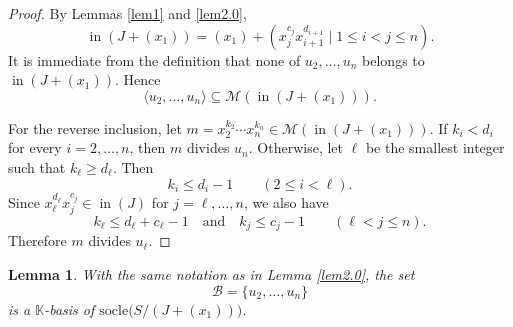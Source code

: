 \documentclass[12pt]{amsart}
\numberwithin{equation}{section}
\newtheorem{lemma}[theorem]{Lemma}
\theoremstyle{definition}
\newcommand{\init}{\ensuremath{\mathop{\mathrm{in}}}}
\newcommand{\socle}{\mathrm{socle}}
\newcommand{\F}{\mathbb{K}}
\begin{document}
\begin{proof}
By Lemmas \ref{lem1} and \ref{lem2.0},
\[
\init(J+(x_1))
=
(x_1)+
(x_j^{c_j}x_{i+1}^{d_{i+1}}
\mid 1\leq i<j\leq n).
\]
It is immediate from the definition that none of
$u_2,\dots,u_n$ belongs to $\init(J+(x_1))$.
Hence
\[
\langle u_2,\dots,u_n\rangle
\subseteq
\mathcal M(\init(J+(x_1))).
\]

For the reverse inclusion, let
$m=x_2^{k_2}\cdots x_n^{k_n}
\in\mathcal M(\init(J+(x_1)))$.
If $k_i<d_i$ for every $i=2,\dots,n$, then $m$ divides $u_n$.
Otherwise, let $\ell$ be the smallest integer such that $k_\ell\geq d_\ell$.
Then
\[
k_i\leq d_i-1\qquad (2\leq i<\ell).
\]
Since $x_\ell^{d_\ell}x_j^{c_j}\in\init(J)$
for $j=\ell,\dots,n$,
we also have
\[
k_\ell\leq d_\ell+c_\ell-1
\quad\text{and}\quad
k_j\leq c_j-1\qquad (\ell<j\leq n).
\]
Therefore $m$ divides $u_\ell$.
\end{proof}
%



\begin{lemma}
    \label{lem2.3}
    With the same notation as in Lemma \ref{lem2.0}, the set
    \[\mathcal B=\{u_2,\dots,u_n\}\]
    is a $\F$-basis of $\socle\big(S/(J+(x_1))\big)$.
\end{lemma}
\end{document}
